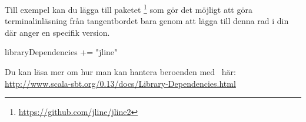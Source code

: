 Till exempel kan du lägga till paketet \footnote{\url{https://github.com/jline/jline2}} som gör det möjligt att göra terminalinläsning från tangentbordet bara genom att lägga till denna rad i din  där  anger en specifik version.

\begin{Code}
libraryDependencies += "jline" %
\end{Code}

Du kan läsa mer om hur man kan hantera beroenden med \sbt\ här: \\ \url{http://www.scala-sbt.org/0.13/docs/Library-Dependencies.html}

